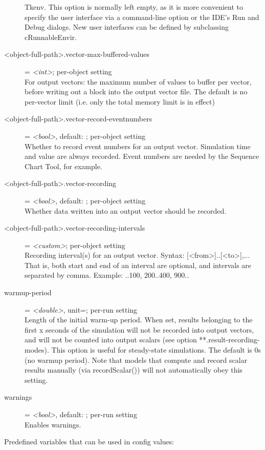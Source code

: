 \begin{description}
    Tkenv. This option is normally left empty, as it is more convenient to
    specify the user interface via a command-line option or the IDE's Run and
    Debug dialogs. New user interfaces can be defined by subclassing
    cRunnableEnvir.
\item[<object-full-path>.vector-max-buffered-values] = \textit{<int>}; per-object setting \\
    For output vectors: the maximum number of values to buffer per vector,
    before writing out a block into the output vector file. The default is no
    per-vector limit (i.e. only the total memory limit is in effect)
\item[<object-full-path>.vector-record-eventnumbers] = \textit{<bool>}, default: ; per-object setting \\
    Whether to record event numbers for an output vector. Simulation time and
    value are always recorded. Event numbers are needed by the Sequence Chart
    Tool, for example.
\item[<object-full-path>.vector-recording] = \textit{<bool>}, default: ; per-object setting \\
    Whether data written into an output vector should be recorded.
\item[<object-full-path>.vector-recording-intervals] = \textit{<custom>}; per-object setting \\
    Recording interval(s) for an output vector. Syntax: [<from>]..[<to>],...
    That is, both start and end of an interval are optional, and intervals are
    separated by comma. Example: ..100, 200..400, 900..
\item[warmup-period] = \textit{<double>}, unit=; per-run setting \\
    Length of the initial warm-up period. When set, results belonging to the
    first x seconds of the simulation will not be recorded into output vectors,
    and will not be counted into output scalars (see option
    **.result-recording-modes). This option is useful for steady-state
    simulations. The default is 0s (no warmup period). Note that models that
    compute and record scalar results manually (via recordScalar()) will not
    automatically obey this setting.
\item[warnings] = \textit{<bool>}, default: ; per-run setting \\
    Enables warnings.
\end{description}

Predefined variables that can be used in config values:

